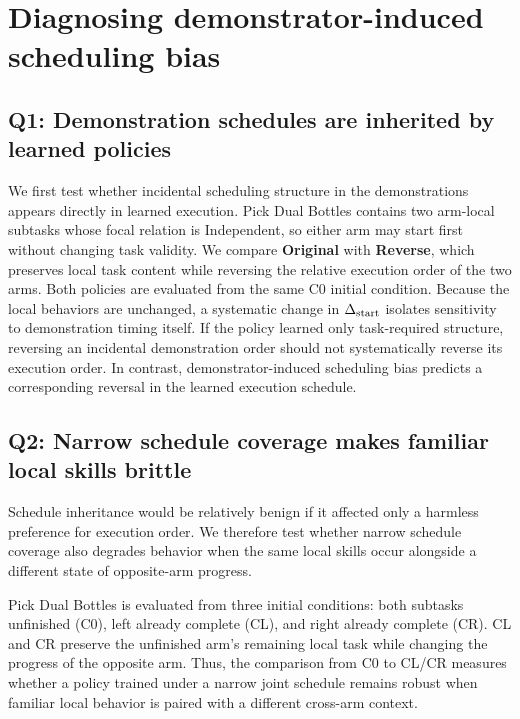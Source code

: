 \documentclass{article}
\begin{document}
\section{Diagnosing demonstrator-induced scheduling bias}
\subsection{Q1: Demonstration schedules are inherited by learned policies}
We first test whether incidental scheduling structure in the demonstrations appears directly in learned execution. Pick Dual Bottles contains two arm-local subtasks whose focal relation is Independent, so either arm may start first without changing task validity. We compare \textbf{Original} with \textbf{Reverse}, which preserves local task content while reversing the relative execution order of the two arms. Both policies are evaluated from the same C0 initial condition. Because the local behaviors are unchanged, a systematic change in $\Delta_{\rm start}$ isolates sensitivity to demonstration timing itself. If the policy learned only task-required structure, reversing an incidental demonstration order should not systematically reverse its execution order. In contrast, demonstrator-induced scheduling bias predicts a corresponding reversal in the learned execution schedule.


\subsection{Q2: Narrow schedule coverage makes familiar local skills brittle}
Schedule inheritance would be relatively benign if it affected only a harmless preference for execution order. We therefore test whether narrow schedule coverage also degrades behavior when the same local skills occur alongside a different state of opposite-arm progress.

Pick Dual Bottles is evaluated from three initial conditions: both subtasks unfinished (C0), left already complete (CL), and right already complete (CR). CL and CR preserve the unfinished arm's remaining local task while changing the progress of the opposite arm. Thus, the comparison from C0 to CL/CR measures whether a policy trained under a narrow joint schedule remains robust when familiar local behavior is paired with a different cross-arm context.

\begin{table}[t]
\caption{Completion-state stress test on Pick Dual Bottles under the reported controlled timing distributions. $W_{\rm unfinished}$ (s) measures unnecessary waiting of the arm that still has work to do; $M_{\rm complete}$ (cm) measures motion of the arm whose responsibility is already complete.}
\label{tab:e1}
\centering\small\setlength{\tabcolsep}{3pt}

\end{table}
\end{document}
